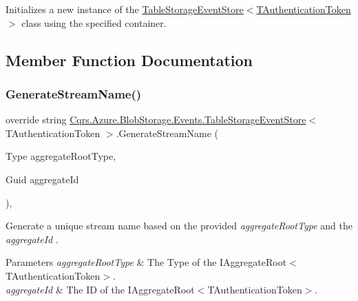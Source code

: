 Initializes a new instance of the \hyperlink{classCqrs_1_1Azure_1_1BlobStorage_1_1Events_1_1TableStorageEventStore_a25a65bc4a027b2a16ebf02e763ac3b95_a25a65bc4a027b2a16ebf02e763ac3b95}{Table\+Storage\+Event\+Store$<$\+T\+Authentication\+Token$>$} class using the specified container. 



\subsection{Member Function Documentation}
\mbox{\label{classCqrs_1_1Azure_1_1BlobStorage_1_1Events_1_1TableStorageEventStore_a5cee1f388c1a03d9cfea5ee1a9f42657_a5cee1f388c1a03d9cfea5ee1a9f42657}} 
\subsubsection{\texorpdfstring{Generate\+Stream\+Name()}{GenerateStreamName()}}
{\footnotesize\ttfamily override string \hyperlink{classCqrs_1_1Azure_1_1BlobStorage_1_1Events_1_1TableStorageEventStore}{Cqrs.\+Azure.\+Blob\+Storage.\+Events.\+Table\+Storage\+Event\+Store}$<$ T\+Authentication\+Token $>$.Generate\+Stream\+Name (\begin{DoxyParamCaption}\item[{Type}]{aggregate\+Root\+Type,  }\item[{Guid}]{aggregate\+Id }\end{DoxyParamCaption})\hspace{0.3cm}{\ttfamily [protected]}, {\ttfamily [virtual]}}



Generate a unique stream name based on the provided {\itshape aggregate\+Root\+Type}  and the {\itshape aggregate\+Id} . 


\begin{DoxyParams}{Parameters}
{\em aggregate\+Root\+Type} & The Type of the I\+Aggregate\+Root$<$\+T\+Authentication\+Token$>$.\\
\hline
{\em aggregate\+Id} & The ID of the I\+Aggregate\+Root$<$\+T\+Authentication\+Token$>$.\\
\hline
\end{DoxyParams}



